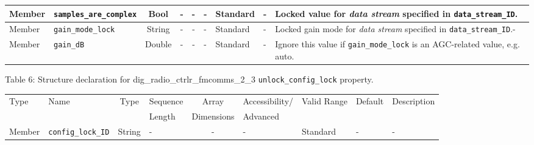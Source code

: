\documentclass{article}
\def\comp{dig\_radio\_ctrlr\_fmcomms\_2\_3}
\begin{document}
\begin{landscape}
\begin{scriptsize}
\begin{longtable}{|p{1.8cm}|p{3.6cm}|c|c|c|p{2cm}|p{1.7cm}|p{1.0cm}|p{7.38cm}|}
			\hline
			Member       & \verb+samples_are_complex+            & Bool   & -       & -          & -              & Standard     & -       & Locked value for \textit{data stream} specified in \verb+data_stream_ID+. \\
			\hline
			Member       & \verb+gain_mode_lock+                 & String & -       & -          & -              & Standard     & -       & Locked gain mode for \textit{data stream} specified in \verb+data_stream_ID+.- \\
			\hline
			Member       & \verb+gain_dB+                        & Double & -       & -          & -              & Standard     & -       & Ignore this value if \verb+gain_mode_lock+ is an AGC-related value, e.g. auto. \\
			\hline
		\end{longtable}
	\end{scriptsize}

	\noindent Table \hypertarget{tab6}{6}: Structure declaration for \comp{} \verb+unlock_config_lock+ property.
	\begin{scriptsize}
		\noindent\begin{longtable}{|p{1.8cm}|p{3.6cm}|c|p{4cm}|c|p{2cm}|p{1.7cm}|p{0.8cm}|p{4.81cm}|}
			\hline
			\rowcolor{blue}
			Type         & Name                                & Type & Sequence & Array      & Accessibility/ & Valid Range  & Default & Description                                                                                                                                                                                                                       \\
			\rowcolor{blue}
			             &                                     &      & Length   & Dimensions & Advanced       &              &         &                                                                                                                                                                                                                             \\
			\hline
			Member       & \verb+config_lock_ID+               & String& -       & -          & -              & Standard     & -       & - \\
			\hline
		\end{longtable}
	\end{scriptsize}


\end{landscape}
\end{document}
